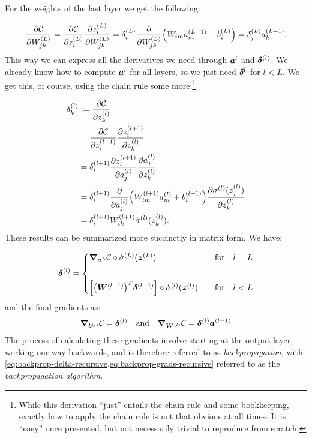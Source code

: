 \documentclass[Thesis.tex]{subfiles}
\begin{document}
For the weights of the last layer we get the following:

\begin{align}
  \pdv{\mathcal{C}}{W_{jk}^{(L)}} =
\pdv{\mathcal{C}}{z_i^{(L)}}\pdv{z_i^{(L)}}{W_{jk}^{(L)}} =
\delta_i^{(L)}\pdv{}{W_{jk}^{(L)}}\qty(W_{im}a_m^{(L-1)} + b_i^{(L)}) = \delta_j^{(L)}a_k^{(L-1)}.
\end{align}
This way we can express all the derivatives we need through $\bm{a}^{l}$ and
$\bm{\delta}^{(l)}$. We already know how to compute $\bm{a}^{l}$ for all layers,
so we just need $\bm{\delta^{l}}$ for $l < L$. We get this, of course, using the
chain rule some more:\footnote{While this derivation ``just'' entails the chain
  rule and some bookkeeping, exactly how to apply the chain rule is not that
  obvious at all times. It is ``easy'' once presented, but not necessarily
  trivial to reproduce from scratch.}

\begin{align}
  \delta_k^{(l)} &\vcentcolon= \pdv{\mathcal{C}}{z_k^{(l)}}\\
                 &= \pdv{\mathcal{C}}{z_i^{(l+1)}}\pdv{z_i^{(l+1)}}{z_k^{(l)}}\\
                 &= \delta_i^{(l+1)} \pdv{z_i^{(l+1)}}{a_j^{(l)}}\pdv{a_j^{(l)}}{z_k^{(l)}} \\
                 &= \delta_i^{(l+1)}\pdv{}{a_j^{(l)}}\qty(W_{im}^{(l+1)}a_m^{(l)} + b_i^{(l+1)})\pdv{\sigma^{(l)}(z_j^{(l)})}{z_k^{(l)}}\\
                 &= \delta_i^{(l+1)}W_{ik}^{(l+1)}\dot\sigma^{(l)}(z_k^{(l)}).
\end{align}
These results can be summarized more succinctly in matrix form. We have:

\begin{align}
  \label{eq:backprop-delta-recursive}
  \vb{\delta}^{(l)} =
                      \begin{cases}
                        \grad_{\vb{a}^{L}}{\mathcal{C}}\circ
                        \dot\sigma^{(L)}(\vb{z}^{(L)}) &\qfor l = L\\[20pt]
                        \qty[\qty(\mat{W}^{(l+1)})^T \vb{\delta}^{(l+1)}]\circ
                            \dot\sigma^{(l)}(\vb{z}^{(l)})&\qfor l < L
                      \end{cases}
\end{align}
and the final gradients as:
\begin{align}
  \label{eq:backprop-grads-recursive}
  \grad_{\vb{b}^{(l)}}{\mathcal{C}} = \vb{\delta}^{(l)}
  \qand \grad_{\mat{W}^{(l)}}{\mathcal{C}} = \vb{\delta}^{(l)}\vb{a}^{(l-1)}
\end{align}
The process of calculating these gradients involve starting at the output layer,
working our way backwards, and is therefore referred to as
\emph{backpropagation}, with
\cref{eq:backprop-delta-recursive,eq:backprop-grads-recursive} referred to as
the \emph{backpropagation algorithm}.
\end{document}
